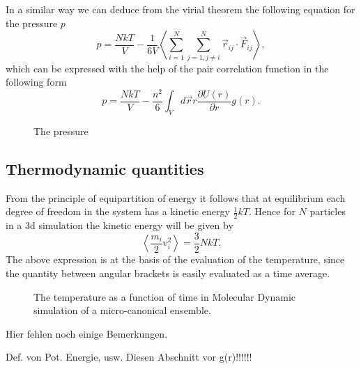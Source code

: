 In a similar way we can deduce from the virial theorem 
the following equation  for the pressure $p$
\begin{displaymath}
  p = \frac{NkT}{V} - \frac{1}{6V}
            \left\langle
               \sum_{i=1}^N \sum_{j=1, j \neq i}^N 
                 \vec{r}_{ij} \cdot \vec{F}_{ij}
             \right\rangle ,
\end{displaymath}
which can be expressed with the help of the pair correlation function 
in the following form
\begin{displaymath}
p = \frac{NkT}{V} - \frac{n^2}{6} \int_V d\vec{r} r 
             \frac{\partial U(r)}{\partial r} g(r).  
\end{displaymath}

\begin{figure}[htbp]
  \begin{center}
    
    \caption{The pressure }
    \label{fig:PressureMD}
  \end{center}
\end{figure}

\subsection{Thermodynamic quantities}
From the principle of equipartition of energy it follows
that at equilibrium each degree of freedom in the system has a kinetic energy
$\frac{1}{2} kT$. Hence for $N$ particles in a 3d simulation the 
kinetic energy will be given by
\begin{displaymath}
  \left\langle \frac{m_i}{2}v_i^2  \right\rangle     =\frac{3}{2} NkT.
\end{displaymath}
The above expression is at the basis of the evaluation of the temperature,
since the quantity between angular brackets is easily evaluated as a time
average. 

\begin{figure}[htbp]
  \begin{center}
    
    \caption{The temperature as a function of time in Molecular Dynamic 
             simulation of a micro-canonical ensemble.}
    \label{fig:TempMicroCanMD}
  \end{center}
\end{figure}

Hier fehlen noch einige Bemerkungen.

Def. von Pot. Energie, usw. Diesen Abschnitt vor g(r)!!!!!!

